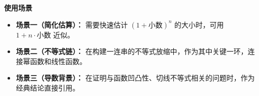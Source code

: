 \begin{explanationbox}
\medskip
\textbf{\textcolor{CExplanation}{使用场景}}
\begin{itemize}[leftmargin=*, itemsep=0.5em, topsep=0.4em]
    \item \textbf{场景一（简化估算）：} 需要快速估计 $(1+\text{小数})^n$ 的大小时，可用 $1+n \cdot \text{小数}$ 近似。
    \item \textbf{场景二（不等式链）：} 在构建一连串的不等式放缩中，作为其中关键一环，连接幂函数和线性函数。
    \item \textbf{场景三（导数背景）：} 在证明与函数凹凸性、切线不等式相关的问题时，作为经典结论直接引用。
\end{itemize}
\end{explanationbox}
